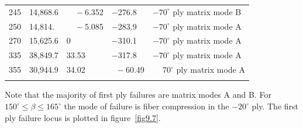 \documentclass{AeroStructure-ERJohnson}
\begin{document}
\begin{example}
\begin{table}[!h]
{\begin{tabular}{@{}lllll@{}}
245 &  14{,}868.6 &  $\phantom{00}-$6.352 &  $-$276.8 &  $-70^{\circ}$ ply matrix mode B\\
250 &  14{,}814. &  $\phantom{00}-$5.085 &  $-$283.9 &  $-70^{\circ}$ ply matrix mode A\\
270 &  15{,}625.6 &  \phantom{$-00$}0 &  $-$310.1 &  $-70^{\circ}$ ply matrix mode A\\
335 &  38{,}849.7 &  \phantom{$-0$}33.53 &  $-$317.8 &  $-70^{\circ}$ ply matrix mode A\\
355 &  30{,}944.9 &  \phantom{$-0$}34.02 &  $\phantom{0}-$60.49 &  $\phantom{-}70^{\circ}$ ply matrix mode A\\
\botrule
\end{tabular}}{}
\end{table}

Note that the majority of first ply failures are matrix modes A and B. For $150^{\circ} \leq \beta \leq 165^{\circ}$ the mode of failure is fiber compression in the $-20^{\circ}$ ply. The first ply failure locus is plotted in figure~\ref{fig9.7}.
\end{example}


\clearpage
\end{document}
